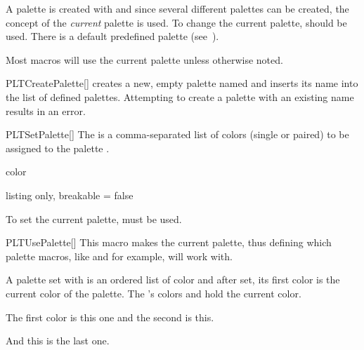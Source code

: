 \documentclass[a4paper, 11pt]{article}
\begin{document}
A palette is created with  and since several different palettes can be created, the concept of the \textit{current} palette is used. To change the current palette,  should be used. There is a default predefined palette (see~).

Most macros will use the current palette unless otherwise noted.

\begin{macro}{PLTCreatePalette}[]
     creates a new, empty palette named  and inserts its name into the list of defined palettes. Attempting to create a palette with an existing name results in an error.
\end{macro}

\begin{macro}{PLTSetPalette}[]
    The  is a comma-separated list of colors (single or paired) to be assigned to the palette .
\end{macro}

\begin{tcolorbox}
    color
\end{tcolorbox}

\begin{example}{listing only, breakable = false}
\end{example}

To set the current palette,  must be used.

\begin{macro}{PLTUsePalette}[]
    This macro makes  the current palette, thus defining which palette macros, like  and  for example, will work with.
\end{macro}

A palette set with  is an ordered list of color and after set, its first color is the current color of the palette. The 's colors  and  hold the current color.

\begin{example}{}

    The first color is \colorbox{PLTBGColor}{\textcolor{PLTFGColor}{this one}} and the second is \PLTNextColor\colorbox{PLTBGColor}{\textcolor{PLTFGColor}{this}}.

    \PLTNextColor
    And \colorbox{PLTBGColor}{\textcolor{PLTFGColor}{this}} is the last one.
\end{example}
\end{document}
